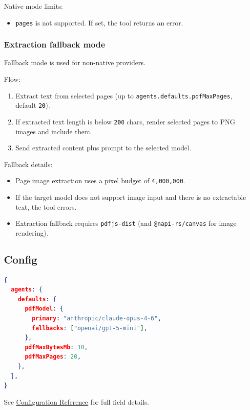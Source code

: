 Native mode limits:

\begin{itemize}
  \item \texttt{pages} is not supported. If set, the tool returns an error.
\end{itemize}


\subsubsection{Extraction fallback mode}


Fallback mode is used for non-native providers.

Flow:

\begin{enumerate}
  \item Extract text from selected pages (up to \texttt{agents.defaults.pdfMaxPages}, default \texttt{20}).
  \item If extracted text length is below \texttt{200} chars, render selected pages to PNG images and include them.
  \item Send extracted content plus prompt to the selected model.
\end{enumerate}


Fallback details:

\begin{itemize}
  \item Page image extraction uses a pixel budget of \texttt{4,000,000}.
  \item If the target model does not support image input and there is no extractable text, the tool errors.
  \item Extraction fallback requires \texttt{pdfjs-dist} (and \texttt{@napi-rs/canvas} for image rendering).
\end{itemize}


\subsection{Config}


\begin{lstlisting}[language=json]
{
  agents: {
    defaults: {
      pdfModel: {
        primary: "anthropic/claude-opus-4-6",
        fallbacks: ["openai/gpt-5-mini"],
      },
      pdfMaxBytesMb: 10,
      pdfMaxPages: 20,
    },
  },
}
\end{lstlisting}


See \href{/gateway/configuration-reference}{Configuration Reference} for full field details.

